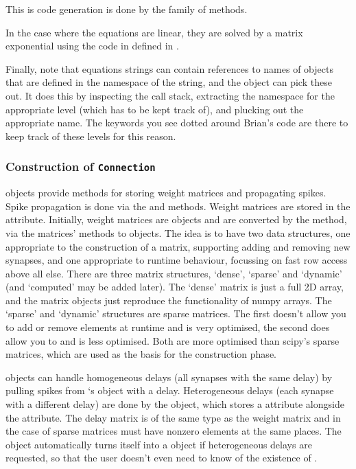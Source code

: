 \documentclass[letterpaper,10pt,english]{manual}
\begin{document}
This is code generation is done by the  family
of methods.

In the case where the equations are linear, they are solved by a matrix
exponential using the code in  defined in
.

Finally, note that equations strings can contain references to names of objects
that are defined in the namespace of the string, and the 
object can pick these out. It does this by inspecting the call stack, extracting
the namespace for the appropriate level (which has to be kept track of), and
plucking out the appropriate name. The  keywords you see dotted
around Brian's code are there to keep track of these levels for this reason.


\subsubsection{Construction of \texttt{Connection}}

 objects provide methods for storing weight matrices and
propagating spikes. Spike propagation is done via the 
and  methods. Weight matrices are stored in the 
attribute. Initially, weight matrices are  objects
and are converted by the  method, via the matrices'
 methods to  objects. The idea
is to have two data structures, one appropriate to the construction of a matrix,
supporting adding and removing new synapses, and one appropriate to runtime
behaviour, focussing on fast row access above all else. There are three matrix
structures, `dense', `sparse' and `dynamic' (and `computed' may be added later).
The `dense' matrix is just a full 2D array, and the matrix objects just reproduce
the functionality of numpy arrays. The `sparse' and `dynamic' structures are
sparse matrices. The first doesn't allow you to add or remove elements at runtime
and is very optimised, the second does allow you to and is less optimised. Both
are more optimised than scipy's sparse matrices, which are used as the basis for
the construction phase.

 objects can handle homogeneous delays (all synapses with the
same delay) by pulling spikes from `s  object with a
delay. Heterogeneous delays (each synapse with a different delay) are done by
the  object, which stores a  attribute
alongside the  attribute. The delay matrix is of the same type as the
weight matrix and in the case of sparse matrices must have nonzero elements at
the same places. The  object automatically turns itself into
a  object if heterogeneous delays are requested, so that
the user doesn't even need to know of the existence of .
\end{document}
